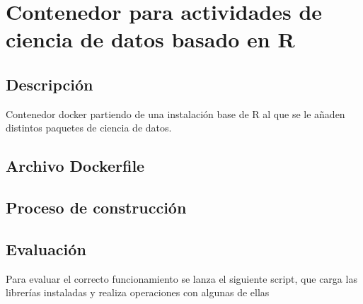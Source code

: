 \section{Contenedor para actividades de ciencia de datos basado en R}

\subsection{Descripción}

Contenedor docker partiendo de una instalación base de R al que se le añaden distintos paquetes de ciencia de datos.

\subsection{Archivo Dockerfile}








\subsection{Proceso de construcción}




\subsection{Evaluación}

Para evaluar el correcto funcionamiento se lanza el siguiente script, que carga las librerías instaladas y realiza operaciones con algunas de ellas